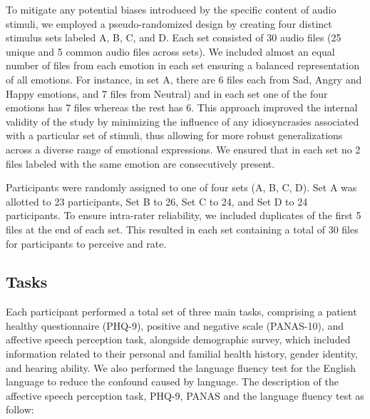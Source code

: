 \documentclass{Interspeech2024}
\begin{document}
To mitigate any potential biases introduced by the specific content of audio stimuli, we employed a pseudo-randomized design by creating four distinct stimulus sets labeled A, B, C, and D. Each set consisted of 30 audio files (25 unique and 5 common audio files across sets). We included almost an equal number of files from each emotion in each set ensuring a balanced representation of all emotions. For instance, in set A, there are 6 files each from Sad, Angry and Happy emotions, and 7 files from Neutral) and in each set one of the four emotions has 7 files whereas the rest has 6. This approach improved the internal validity of the study by minimizing the influence of any idiosyncrasies associated with a particular set of stimuli, thus allowing for more robust generalizations across a diverse range of emotional expressions. We ensured that in each set no 2 files labeled with the same emotion are consecutively present. 

Participants were randomly assigned to one of four sets (A, B, C, D). Set A was allotted to 23 participants, Set B to 26, Set C to 24, and Set D to 24 participants. To ensure intra-rater reliability, we included duplicates of the first 5 files at the end of each set. This resulted in each set containing a total of 30 files for participants to perceive and rate. 

\subsection{Tasks}
Each participant performed a total set of three main tasks, comprising a patient healthy questionnaire (PHQ-9), positive and negative scale (PANAS-10), and affective speech perception task, alongside demographic survey, which included information related to their personal and familial health history, gender identity, and hearing ability. We also performed the language fluency test for the English language to reduce the confound caused by language. The description of the affective speech perception task, PHQ-9, PANAS and the language fluency test as follow: 
\end{document}
